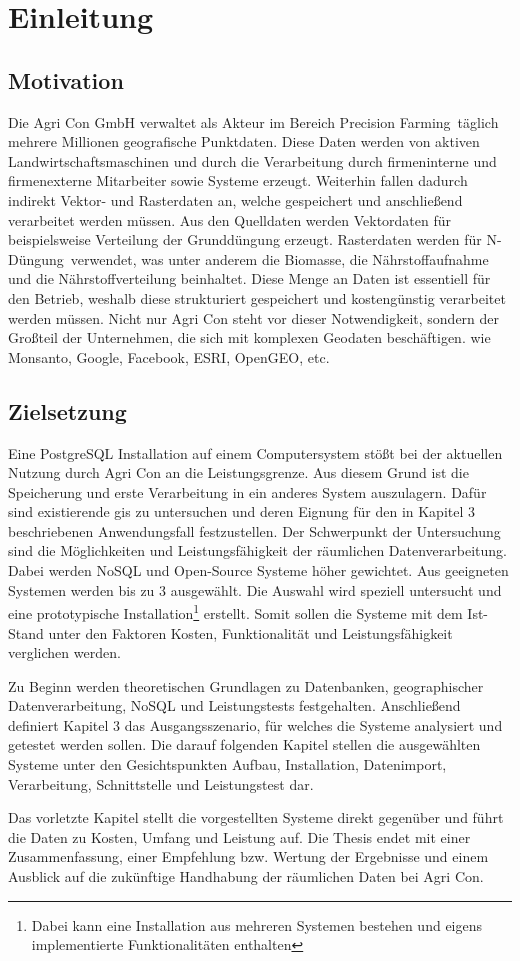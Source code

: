 \chapter{Einleitung}


\section{Motivation}

Die Agri Con GmbH verwaltet als Akteur im Bereich \glqq Precision Farming\grqq\ täglich mehrere Millionen geografische Punktdaten. Diese Daten werden von aktiven Landwirtschaftsmaschinen und durch die Verarbeitung durch firmeninterne und firmenexterne Mitarbeiter sowie Systeme erzeugt. Weiterhin fallen dadurch indirekt Vektor- und Rasterdaten an, welche gespeichert und anschließend verarbeitet werden müssen.
Aus den Quelldaten werden Vektordaten für beispielsweise Verteilung der Grunddüngung erzeugt. Rasterdaten werden für \glqq N-Düngung\grqq\  verwendet, was unter anderem die Biomasse, die Nährstoffaufnahme und die Nährstoffverteilung beinhaltet.
Diese Menge an Daten ist essentiell für den Betrieb, weshalb diese strukturiert gespeichert und kostengünstig verarbeitet werden müssen. Nicht nur Agri Con steht vor dieser Notwendigkeit, sondern der Großteil der Unternehmen, die sich mit komplexen Geodaten beschäftigen. wie Monsanto, Google, Facebook, ESRI, OpenGEO, etc.


\section{Zielsetzung}
Eine PostgreSQL Installation auf einem Computersystem stößt bei der aktuellen Nutzung durch Agri Con an die Leistungsgrenze.
Aus diesem Grund ist die Speicherung und erste Verarbeitung in ein anderes System auszulagern.
Dafür sind existierende \Gls{gis} zu untersuchen und deren Eignung für den in Kapitel 3 beschriebenen Anwendungsfall festzustellen. Der Schwerpunkt der Untersuchung sind die Möglichkeiten und Leistungsfähigkeit der räumlichen Datenverarbeitung.
Dabei werden NoSQL und Open-Source Systeme höher gewichtet.
Aus geeigneten Systemen werden bis zu 3 ausgewählt. Die Auswahl wird speziell untersucht und eine prototypische Installation\footnote{Dabei kann eine Installation aus mehreren Systemen bestehen und  eigens implementierte Funktionalitäten enthalten} erstellt.
Somit sollen die Systeme mit dem Ist-Stand unter den Faktoren Kosten, Funktionalität und Leistungsfähigkeit verglichen werden.


Zu Beginn werden theoretischen Grundlagen zu Datenbanken, geographischer Datenverarbeitung, NoSQL und Leistungstests festgehalten.
Anschließend definiert Kapitel 3 das Ausgangsszenario, für welches die Systeme analysiert und getestet werden sollen.
Die darauf folgenden Kapitel stellen die ausgewählten Systeme unter den Gesichtspunkten Aufbau, Installation, Datenimport, Verarbeitung, Schnittstelle und Leistungstest dar.

Das vorletzte Kapitel stellt die vorgestellten Systeme direkt gegenüber und führt die Daten zu Kosten, Umfang und Leistung auf.
Die Thesis endet mit einer Zusammenfassung, einer Empfehlung bzw. Wertung der Ergebnisse und einem Ausblick auf die zukünftige Handhabung der räumlichen Daten bei Agri Con.